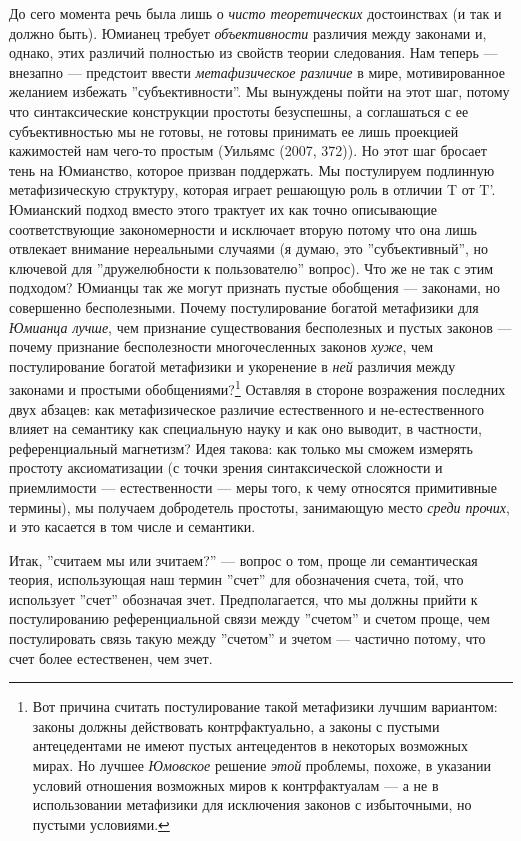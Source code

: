 \documentclass[11pt]{book}
\begin{document}
До сего момента речь была лишь о \textit{чисто теоретических} достоинствах (и так и должно быть). Юмианец требует \textit{объективности} различия между законами и, однако, этих различий полностью из свойств теории следования. Нам теперь --- внезапно --- предстоит ввести \textit{метафизическое различие} в мире, мотивированное желанием избежать ''субъективности''. Мы вынуждены пойти на этот шаг, потому что синтаксические конструкции простоты безуспешны, а соглашаться с ее субъективностью мы не готовы, не готовы принимать ее лишь проекцией кажимостей нам чего-то простым (Уильямс (2007, 372)). Но этот шаг бросает тень на Юмианство, которое призван поддержать. Мы постулируем подлинную метафизическую структуру, которая играет решающую роль в отличии T от T'. Юмианский подход вместо этого трактует их как точно описывающие соответствующие закономерности и исключает вторую потому что она лишь отвлекает внимание нереальными случаями (я думаю, это ''субъективный'', но ключевой для ''дружелюбности к пользователю'' вопрос). Что же не так с этим подходом? Юмианцы так же могут признать пустые обобщения --- законами, но совершенно бесполезными. Почему постулирование богатой метафизики для \textit{Юмианца лучше}, чем признание существования бесполезных и пустых законов --- почему признание бесполезности многочесленных законов \textit{хуже}, чем постулирование богатой метафизики и укоренение в \textit{ней} различия между законами и простыми обобщениями?\footnote{Вот причина считать постулирование такой метафизики лучшим вариантом: законы должны действовать контрфактуально, а законы с пустыми антецедентами не имеют пустых антецедентов в некоторых возможных мирах. Но лучшее \textit{Юмовское} решение \textit{этой} проблемы, похоже, в указании условий отношения возможных миров к контрфактуалам --- а не в использовании метафизики для исключения законов с избыточными, но пустыми условиями.} Оставляя в стороне возражения последних двух абзацев: как метафизическое различие естественного и не-естественного влияет на семантику как специальную науку и как оно выводит, в частности, референциальный магнетизм? Идея такова: как только мы сможем измерять простоту аксиоматизации (с точки зрения синтаксической сложности и приемлимости --- естественности --- меры того, к чему относятся примитивные термины), мы получаем добродетель простоты, занимающую место \textit{среди прочих}, и это касается в том числе и семантики.

Итак, ''считаем мы или зчитаем?'' --- вопрос о том, проще ли семантическая теория, использующая наш термин ''счет'' для обозначения счета, той, что использует ''счет'' обозначая зчет. Предполагается, что мы должны прийти к постулированию референциальной связи между ''счетом'' и счетом проще, чем постулировать связь такую между ''счетом'' и зчетом --- частично потому, что счет более естественен, чем зчет.
\end{document}
